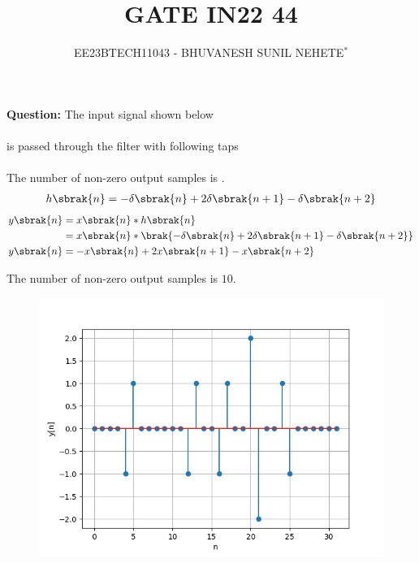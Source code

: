 \documentclass[journal,12pt,twocolumn]{IEEEtran}
\theoremstyle{remark}
\begin{document}

\vspace{3cm}

\title{GATE IN22 44}
\author{EE23BTECH11043 - BHUVANESH SUNIL NEHETE$^{*}$%
}
\maketitle
\newpage
\bigskip

\renewcommand{\thefigure}{\theenumi}
\renewcommand{\thetable}{\theenumi}



\textbf{Question:}
The input signal shown below \\
\\
is passed through the filter with following taps\\
\\
The number of non-zero output samples is \underline{\hspace{1cm}}.\\

\solution
\fi
\begin{align}
    h\sbrak{n}=-\delta\sbrak{n}+2\delta\sbrak{n+1}-\delta\sbrak{n+2}
\end{align}
\begin{align}
    y\sbrak{n}&=x\sbrak{n}*h\sbrak{n}\\
    &=x\sbrak{n}*\brak{-\delta\sbrak{n}+2\delta\sbrak{n+1}-\delta\sbrak{n+2}}\\
    y\sbrak{n}&=-x\sbrak{n}+2x\sbrak{n+1}-x\sbrak{n+2}
\end{align}


The number of non-zero output samples is $10$.

\begin{figure}
    \centering
    \includegraphics[width=1\linewidth]{2022/IN/44/figs/fig.png}
\end{figure}
\end{document}
